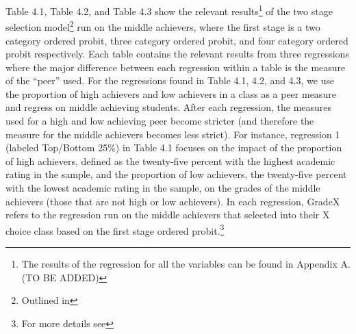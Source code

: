 Table 4.1, Table 4.2, and Table 4.3 show the relevant results\footnote{The results of the regression for all the variables can be found in Appendix A. (TO BE ADDED)} of the two stage selection model\footnote{Outlined in } run on the middle achievers, where the first stage is a two category ordered probit, three category ordered probit, and four category ordered probit respectively. 
Each table contains the relevant results from three regressions where the major difference between each regression within a table is the measure of the ``peer'' used. 
For the regressions found in Table 4.1, 4.2, and 4.3, we use the proportion of high achievers and low achievers in a class as a peer measure and regress on middle achieving students. 
After each regression, the measures used for a high and low achieving peer become stricter (and therefore the measure for the middle achievers becomes less strict). 
For instance, regression 1 (labeled Top/Bottom 25\%) in Table 4.1 focuses on the impact of the proportion of high achievers, defined as the twenty-five percent with the highest academic rating in the sample, and the proportion of low achievers, the twenty-five percent with the lowest academic rating in the sample, on the grades of the middle achievers (those that are not high or low achievers). 
In each regression, GradeX refers to the regression run on the middle achievers that selected into their X choice class based on the first stage ordered probit.\footnote{For more details see } 

\clearpage{}

